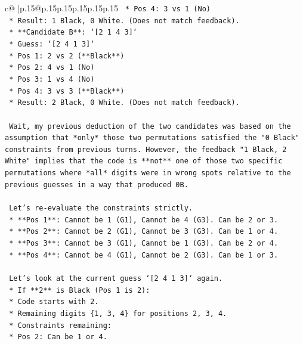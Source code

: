 \documentclass{article}
\begin{document}
{\begin{supertabular}{c@{$\;$}|p{.15\linewidth}@{}p{.15\linewidth}p{.15\linewidth}p{.15\linewidth}p{.15\linewidth}p{.15\linewidth}}
{{{\texttt{            *   Pos 4: 3 vs 1 (No)} \\
\texttt{            *   Result: 1 Black, 0 White. (Does not match feedback).} \\
\texttt{        *   **Candidate B**: `{[}2 1 4 3{]}`} \\
\texttt{            *   Guess: `{[}2 4 1 3{]}`} \\
\texttt{            *   Pos 1: 2 vs 2 (**Black**)} \\
\texttt{            *   Pos 2: 4 vs 1 (No)} \\
\texttt{            *   Pos 3: 1 vs 4 (No)} \\
\texttt{            *   Pos 4: 3 vs 3 (**Black**)} \\
\texttt{            *   Result: 2 Black, 0 White. (Does not match feedback).} \\
\\ 
\texttt{    Wait, my previous deduction of the two candidates was based on the assumption that *only* those two permutations satisfied the "0 Black" constraints from previous turns. However, the feedback "1 Black, 2 White" implies that the code is **not** one of those two specific permutations where *all* digits were in wrong spots relative to the previous guesses in a way that produced 0B.} \\
\\ 
\texttt{    Let's re{-}evaluate the constraints strictly.} \\
\texttt{    *   **Pos 1**: Cannot be 1 (G1), Cannot be 4 (G3). Can be 2 or 3.} \\
\texttt{    *   **Pos 2**: Cannot be 2 (G1), Cannot be 3 (G3). Can be 1 or 4.} \\
\texttt{    *   **Pos 3**: Cannot be 3 (G1), Cannot be 1 (G3). Can be 2 or 4.} \\
\texttt{    *   **Pos 4**: Cannot be 4 (G1), Cannot be 2 (G3). Can be 1 or 3.} \\
\\ 
\texttt{    Let's look at the current guess `{[}2 4 1 3{]}` again.} \\
\texttt{    *   If **2** is Black (Pos 1 is 2):} \\
\texttt{        *   Code starts with 2.} \\
\texttt{        *   Remaining digits \{1, 3, 4\} for positions 2, 3, 4.} \\
\texttt{        *   Constraints remaining:} \\
\texttt{            *   Pos 2: Can be 1 or 4.} \\
}}}
\end{supertabular}}
\end{document}
